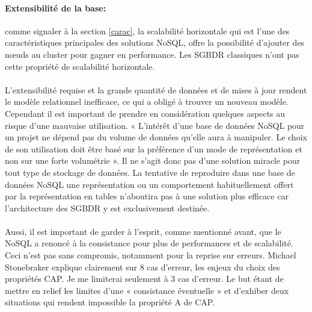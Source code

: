 \paragraph{Extensibilité de la base:} comme signaler à la section \ref{carac}, 
la scalabilité horizontale qui est l'une des caractéristiques principales 
des solutions \textsf{NoSQL}, offre la possibilité 
d'ajouter des nœuds au cluster pour gagner en performance. Les \textsf{SGBDR} classiques 
n'ont pas cette propriété de scalabilité horizontale.
\\ 
\\ 
L'extensibilité requise et la grande quantité de données
et de mises à jour rendent le modèle relationnel inefficace, ce qui a
obligé à trouver un nouveau modèle. Cependant il est important de prendre en
considération quelques aspects au risque d'une mauvaise utilisation. «
L’intérêt d’une base de données \textsf{NoSQL} pour un projet ne
dépend pas du volume de données qu’elle aura à manipuler. Le choix de
son utilisation doit être basé sur la préférence d’un mode de
représentation et non sur une forte volumétrie
»\cite{NoSQLeurope}. Il ne s’agit donc pas d’une solution
miracle pour tout type de stockage de données.  La tentative de
reproduire dans une base de données \textsf{NoSQL} une représentation
ou un comportement habituellement offert par la représentation en tables
n'aboutira pas à une solution plus efficace car l'architecture des 
\textsf{SGBDR} y est exclusivement destinée.
\\
\\
Aussi, il est important de garder à l'esprit, comme mentionné avant, 
que le \textsf{NoSQL} a renoncé à la consistance
pour plus de performances et de scalabilité. Ceci n'est pas sans compromis, notamment 
pour la reprise sur erreurs. 
\textsf{Michael Stonebraker} explique clairement sur 8 cas d'erreur,  
les enjeux du choix
des propriétés \textsf{CAP}\cite{MichaelStonebraker2}. Je me limiterai seulement à
3 cas d'erreur. Le but étant de mettre en relief les limites d'une « \textsf{consistance éventuelle} »
et d'exhiber deux situations qui rendent impossible la propriété \textsf{A} de \textsf{CAP}.
\def\exempleA{We assume a typical hardware model of a
collection of local processing and storage nodes assembled into a cluster using LAN networking.
The clusters, in turn, are wired together using WAN networking.
Let’s start with a discussion of what causes errors in databases:}

